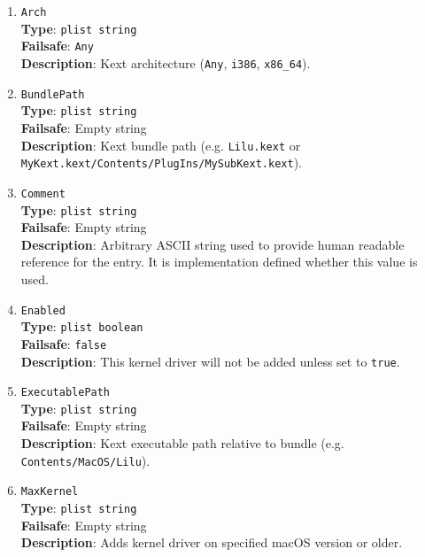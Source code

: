 \documentclass[]{article}
\begin{document}
\begin{enumerate}
\item
  \texttt{Arch}\\
  \textbf{Type}: \texttt{plist\ string}\\
  \textbf{Failsafe}: \texttt{Any}\\
  \textbf{Description}: Kext architecture (\texttt{Any}, \texttt{i386}, \texttt{x86\_64}).

\item
  \texttt{BundlePath}\\
  \textbf{Type}: \texttt{plist\ string}\\
  \textbf{Failsafe}: Empty string\\
  \textbf{Description}: Kext bundle path (e.g. \texttt{Lilu.kext}
  or \texttt{MyKext.kext/Contents/PlugIns/MySubKext.kext}).

\item
  \texttt{Comment}\\
  \textbf{Type}: \texttt{plist\ string}\\
  \textbf{Failsafe}: Empty string\\
  \textbf{Description}: Arbitrary ASCII string used to provide human readable
  reference for the entry. It is implementation defined whether this value is
  used.

\item
  \texttt{Enabled}\\
  \textbf{Type}: \texttt{plist\ boolean}\\
  \textbf{Failsafe}: \texttt{false}\\
  \textbf{Description}: This kernel driver will not be added unless set to
  \texttt{true}.

\item
  \texttt{ExecutablePath}\\
  \textbf{Type}: \texttt{plist\ string}\\
  \textbf{Failsafe}: Empty string\\
  \textbf{Description}: Kext executable path relative to bundle
  (e.g. \texttt{Contents/MacOS/Lilu}).

\item
  \texttt{MaxKernel}\\
  \textbf{Type}: \texttt{plist\ string}\\
  \textbf{Failsafe}: Empty string\\
  \textbf{Description}: Adds kernel driver on specified macOS version or older.


\end{enumerate}
\end{document}
